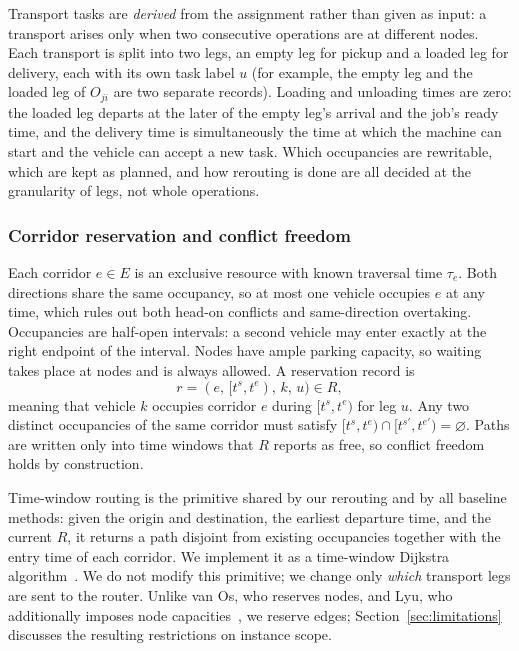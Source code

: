 Transport tasks are \emph{derived} from the assignment rather than given as input: a transport arises only when two consecutive operations are at different nodes.
Each transport is split into two legs, an empty leg for pickup and a loaded leg for delivery, each with its own task label \(u\)
(for example, the empty leg and the loaded leg of \(O_{ji}\) are two separate records). Loading and unloading times are zero: the loaded leg departs at the later of
the empty leg's arrival and the job's ready time, and the delivery time is simultaneously the time at which the machine can start and the vehicle can accept a new task.
Which occupancies are rewritable, which are kept as planned, and how rerouting is done are all decided at the granularity of legs, not whole operations.

\subsubsection{Corridor reservation and conflict freedom}
\label{sec:reservation}

Each corridor \(e\in E\) is an exclusive resource with known traversal time \(\tau_e\). Both directions share the same occupancy,
so at most one vehicle occupies \(e\) at any time, which rules out both head-on conflicts and same-direction overtaking.
Occupancies are half-open intervals: a second vehicle may enter exactly at the right endpoint of the interval.
Nodes have ample parking capacity, so waiting takes place at nodes and is always allowed.
A reservation record is
\[
r=(e,\,[t^s,t^e),\,k,\,u)\in R,
\]
meaning that vehicle \(k\) occupies corridor \(e\) during \([t^s,t^e)\) for leg \(u\).
Any two distinct occupancies of the same corridor must satisfy
\([t^s,t^e)\cap[t^{s\prime},t^{e\prime})=\varnothing\).
Paths are written only into time windows that \(R\) reports as free, so conflict freedom holds by construction.

Time-window routing is the primitive shared by our rerouting and by all baseline methods: given the origin and destination, the earliest departure time, and the current \(R\),
it returns a path disjoint from existing occupancies together with the entry time of each corridor.
We implement it as a time-window Dijkstra algorithm~\cite{sun2023integrated}. We do not modify this primitive;
we change only \emph{which} transport legs are sent to the router.
Unlike van Os, who reserves nodes, and Lyu, who additionally imposes node capacities~\cite{vanos2026exact,lyu2019approach},
we reserve edges; Section~\ref{sec:limitations} discusses the resulting restrictions on instance scope.

